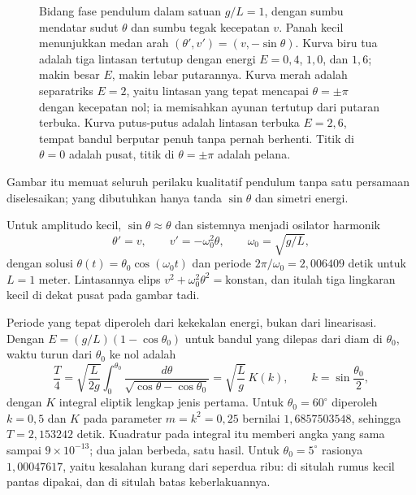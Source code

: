 \begin{figure}[htbp]
\caption{Bidang fase pendulum dalam satuan $g/L=1$, dengan sumbu mendatar sudut
$\theta$ dan sumbu tegak kecepatan $v$. Panah kecil menunjukkan medan arah
$(\theta',v')=(v,-\sin\theta)$. Kurva biru tua adalah tiga lintasan tertutup dengan
energi $E=0{,}4$, $1{,}0$, dan $1{,}6$; makin besar $E$, makin lebar putarannya.
Kurva merah adalah separatriks $E=2$, yaitu lintasan yang tepat mencapai
$\theta=\pm\pi$ dengan kecepatan nol; ia memisahkan ayunan tertutup dari putaran
terbuka. Kurva putus-putus adalah lintasan terbuka $E=2{,}6$, tempat bandul
berputar penuh tanpa pernah berhenti. Titik di $\theta=0$ adalah pusat, titik di
$\theta=\pm\pi$ adalah pelana.}
\label{fig:bidang-fase-pendulum}
\end{figure}

Gambar itu memuat seluruh perilaku kualitatif pendulum tanpa satu persamaan
diselesaikan; yang dibutuhkan hanya tanda $\sin\theta$ dan simetri energi.

Untuk amplitudo kecil, $\sin\theta\approx\theta$ dan sistemnya menjadi
osilator harmonik
\[
\theta'=v,\qquad v'=-\omega_{0}^{2}\theta,\qquad \omega_{0}=\sqrt{g/L},
\]
dengan solusi $\theta(t)=\theta_{0}\cos(\omega_{0}t)$ dan periode
$2\pi/\omega_{0}=2{,}006409$ detik untuk $L=1$ meter. Lintasannya elips
$v^{2}+\omega_{0}^{2}\theta^{2}=\text{konstan}$, dan itulah tiga lingkaran
kecil di dekat pusat pada gambar tadi.

Periode yang tepat diperoleh dari kekekalan energi, bukan dari linearisasi.
Dengan $E=(g/L)(1-\cos\theta_{0})$ untuk bandul yang dilepas dari diam di
$\theta_{0}$, waktu turun dari $\theta_{0}$ ke nol adalah
\[
\frac{T}{4}=\sqrt{\frac{L}{2g}}\int_{0}^{\theta_{0}}
\frac{d\theta}{\sqrt{\cos\theta-\cos\theta_{0}}}
=\sqrt{\frac{L}{g}}\,K(k),\qquad k=\sin\frac{\theta_{0}}{2},
\]
dengan $K$ integral eliptik lengkap jenis pertama. Untuk $\theta_{0}=60^{\circ}$
diperoleh $k=0{,}5$ dan $K$ pada parameter $m=k^{2}=0{,}25$ bernilai $1{,}6857503548$,
sehingga $T=2{,}153242$ detik. Kuadratur pada integral itu memberi angka yang sama
sampai $9\times10^{-13}$; dua jalan berbeda, satu hasil. Untuk $\theta_{0}=5^{\circ}$
rasionya $1{,}00047617$, yaitu kesalahan kurang dari seperdua ribu: di situlah
rumus kecil pantas dipakai, dan di situlah batas keberlakuannya.

